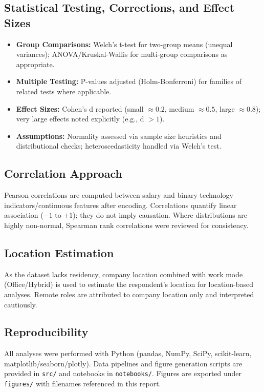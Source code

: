 \documentclass[12pt,a4paper]{article}
\begin{document}
\subsection{Statistical Testing, Corrections, and Effect Sizes}
\begin{itemize}
    \item \textbf{Group Comparisons:} Welch's t-test for two-group means (unequal variances); ANOVA/Kruskal-Wallis for multi-group comparisons as appropriate.
    \item \textbf{Multiple Testing:} P-values adjusted (Holm-Bonferroni) for families of related tests where applicable.
    \item \textbf{Effect Sizes:} Cohen's d reported (small \(\approx 0.2\), medium \(\approx 0.5\), large \(\approx 0.8\)); very large effects noted explicitly (e.g., d \(>1\)).
    \item \textbf{Assumptions:} Normality assessed via sample size heuristics and distributional checks; heteroscedasticity handled via Welch's test.
\end{itemize}

\subsection{Correlation Approach}
Pearson correlations are computed between salary and binary technology indicators/continuous features after encoding. Correlations quantify linear association (\(-1\) to \(+1\)); they do not imply causation. Where distributions are highly non-normal, Spearman rank correlations were reviewed for consistency.

\subsection{Location Estimation}
As the dataset lacks residency, company location combined with work mode (Office/Hybrid) is used to estimate the respondent's location for location-based analyses. Remote roles are attributed to company location only and interpreted cautiously.

\subsection{Reproducibility}
All analyses were performed with Python (pandas, NumPy, SciPy, scikit-learn, matplotlib/seaborn/plotly). Data pipelines and figure generation scripts are provided in \texttt{src/} and notebooks in \texttt{notebooks/}. Figures are exported under \texttt{figures/} with filenames referenced in this report.
\end{document}
